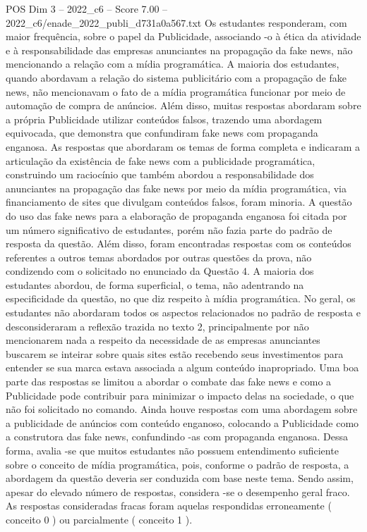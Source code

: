 \begin{textsample}{POS Dim 3 – 2022\_c6 – Score 7.00 – 2022\_c6/enade\_2022\_publi\_d731a0a567.txt}
Os estudantes responderam, com maior frequência, sobre o papel da Publicidade, associando -o à ética da atividade e à responsabilidade das empresas anunciantes na propagação da fake news, não mencionando a relação com a mídia programática.
A maioria dos estudantes, quando abordavam a relação do sistema publicitário com a propagação de fake news, não mencionavam o fato de a mídia programática funcionar por meio de automação de compra de anúncios.
Além disso, muitas respostas abordaram sobre a própria Publicidade utilizar conteúdos falsos, trazendo uma abordagem equivocada, que demonstra que confundiram fake news com propaganda enganosa.
As respostas que abordaram os temas de forma completa e indicaram a articulação da existência de fake news com a publicidade programática, construindo um raciocínio que também abordou a responsabilidade dos anunciantes na propagação das fake news por meio da mídia programática, via financiamento de sites que divulgam conteúdos falsos, foram minoria.
A questão do uso das fake news para a elaboração de propaganda enganosa foi citada por um número significativo de estudantes, porém não fazia parte do padrão de resposta da questão.
Além disso, foram encontradas respostas com os conteúdos referentes a outros temas abordados por outras questões da prova, não condizendo com o solicitado no enunciado da Questão 4.
A maioria dos estudantes abordou, de forma superficial, o tema, não adentrando na especificidade da questão, no que diz respeito à mídia programática.
No geral, os estudantes não abordaram todos os aspectos relacionados no padrão de resposta e desconsideraram a reflexão trazida no texto 2, principalmente por não mencionarem nada a respeito da necessidade de as empresas anunciantes buscarem se inteirar sobre quais sites estão recebendo seus investimentos para entender se sua marca estava associada a algum conteúdo inapropriado.
Uma boa parte das respostas se limitou a abordar o combate das fake news e como a Publicidade pode contribuir para minimizar o impacto delas na sociedade, o que não foi solicitado no comando.
Ainda houve respostas com uma abordagem sobre a publicidade de anúncios com conteúdo enganoso, colocando a Publicidade como a construtora das fake news, confundindo -as com propaganda enganosa.
Dessa forma, avalia -se que muitos estudantes não possuem entendimento suficiente sobre o conceito de mídia programática, pois, conforme o padrão de resposta, a abordagem da questão deveria ser conduzida com base neste tema.
Sendo assim, apesar do elevado número de respostas, considera -se o desempenho geral fraco.
As respostas consideradas fracas foram aquelas respondidas erroneamente ( conceito 0 ) ou parcialmente ( conceito 1 ).

\end{textsample}
